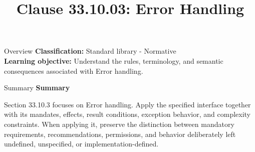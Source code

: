\documentclass[10pt,letterpaper]{article}
\title{Clause 33.10.03: Error Handling}
\author{}
\date{}
\begin{document}
\maketitle
\begin{CornellOverviewBox}{Overview}
\textbf{Classification:} Standard library - Normative\\[2pt]
\textbf{Learning objective:} Understand the rules, terminology, and semantic consequences associated with Error handling.
\end{CornellOverviewBox}\begin{CornellSummaryBox}{Summary}
{\sffamily\bfseries\color{Accent} Summary}\par\vspace{3pt}Section 33.10.3 focuses on Error handling. Apply the specified interface together with its mandates, effects, result conditions, exception behavior, and complexity constraints. When applying it, preserve the distinction between mandatory requirements, recommendations, permissions, and behavior deliberately left undefined, unspecified, or implementation-defined.
\end{CornellSummaryBox}
\end{document}
